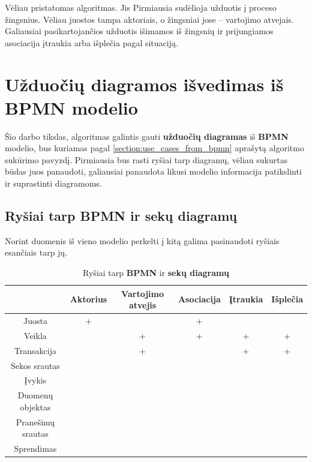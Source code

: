 \documentclass{VUMIFInfBakalaurinis}
\begin{document}
Vėliau pristatomas algoritmas. Jis Pirmiausia sudėlioja užduotis į proceso žingsnius. Vėliau juostos tampa aktoriais, o žingsniai jose – vartojimo atvejais. Galiausiai pasikartojančios užduotis išimamos iš žingsnių ir prijungiamos asociacija įtraukia arba išplečia pagal situaciją.

\section{\textbf{Užduočių diagramos} išvedimas iš \textbf{BPMN} modelio}

Šio darbo tikslas, algoritmas galintis gauti \textbf{užduočių diagramas} iš \textbf{BPMN} modelio, bus kuriamas pagal \ref{section:use_cases_from_bpmn} aprašytą algoritmo sukūrimo pavyzdį. Pirmiausia bus rasti ryšiai tarp diagramų, vėliau sukurtas būdas juos panaudoti, galiausiai panaudota likusi modelio informacija patikslinti ir suprastinti diagramoms.

\subsection{Ryšiai tarp \textbf{BPMN} ir \textbf{sekų diagramų}} \label{section:relations_sd_bpmn}

Norint duomenis iš vieno modelio perkelti į kitą galima pasinaudoti ryšiais esančiais tarp jų.

\begin{center}
    \begin{longtable}{ | c | c |  c | c | c | c |}
    \caption{Ryšiai tarp \textbf{BPMN} ir \textbf{sekų diagramų}}
	\label{tab:relations_sd_bpmn}
    \\ \hline 
     & 
     Aktorius 
     & 
     Vartojimo atvejis 
     & 
     Asociacija 
     & 
     Įtraukia 
     & 
     Išplečia 
     \\ 
    \hline 
    Juosta & + & & + &  &  \\
    \hline
    Veikla  & & + & + & + & + \\
    \hline
    Transakcija & & + & & + & + \\
    \hline
    Sekos srautas  & &  & & & \\
    \hline
    Įvykis  & & & & & \\
    \hline 
    Duomenų objektas  & & & & & \\
    \hline
    Pranešimų srautas  & & & & & \\
    \hline
    Sprendimas  & & & & & \\
    \hline
    \end{longtable}
\end{center} 
\end{document}
